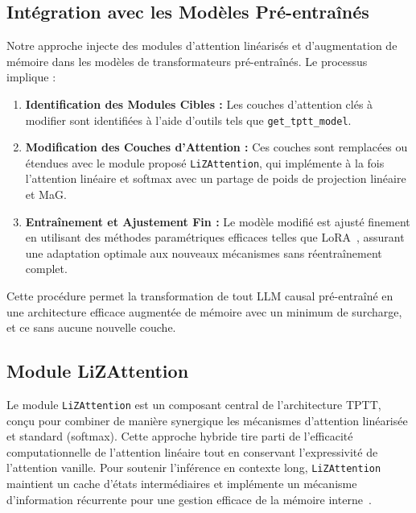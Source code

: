\documentclass[10pt,a4paper]{article}
\begin{document}
\subsection{Intégration avec les Modèles Pré-entraînés}

Notre approche injecte des modules d'attention linéarisés et d'augmentation de mémoire dans les modèles de transformateurs pré-entraînés. Le processus implique :
\begin{enumerate}
    \item \textbf{Identification des Modules Cibles :} Les couches d'attention clés à modifier sont identifiées à l'aide d'outils tels que \texttt{get\_tptt\_model}.
    \item \textbf{Modification des Couches d'Attention :} Ces couches sont remplacées ou étendues avec le module proposé \texttt{LiZAttention}, qui implémente à la fois l'attention linéaire et softmax avec un partage de poids de projection linéaire et MaG.
    \item \textbf{Entraînement et Ajustement Fin :} Le modèle modifié est ajusté finement en utilisant des méthodes paramétriques efficaces telles que LoRA~\cite{hu2022lora}, assurant une adaptation optimale aux nouveaux mécanismes sans réentraînement complet.
\end{enumerate}
Cette procédure permet la transformation de tout LLM causal pré-entraîné en une architecture efficace augmentée de mémoire avec un minimum de surcharge, et ce sans aucune nouvelle couche.

\subsection{Module LiZAttention}

Le module \texttt{LiZAttention} est un composant central de l'architecture TPTT, conçu pour combiner de manière synergique les mécanismes d'attention linéarisée et standard (softmax). Cette approche hybride tire parti de l'efficacité computationnelle de l'attention linéaire tout en conservant l'expressivité de l'attention vanille. Pour soutenir l'inférence en contexte long, \texttt{LiZAttention} maintient un cache d'états intermédiaires et implémente un mécanisme d'information récurrente pour une gestion efficace de la mémoire interne~\cite{katharopoulos2020transformers}.
\end{document}
